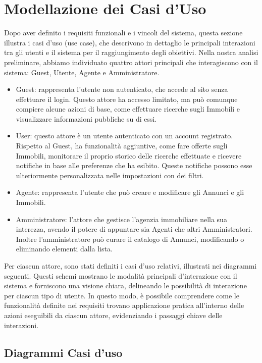 \newpage
\section{Modellazione dei Casi d'Uso}
Dopo aver definito i requisiti funzionali e i vincoli del sistema, questa sezione illustra i casi
d'uso (use case), che descrivono in dettaglio le principali interazioni tra gli utenti e il sistema
per il raggiungimento degli obiettivi. Nella nostra analisi preliminare, abbiamo individuato quattro
attori principali che interagiscono con il sistema: Guest, Utente, Agente e Amministratore.\\
\begin{itemize}
    \item Guest: rappresenta l'utente non autenticato, che accede al sito senza effettuare il login. Questo attore ha accesso limitato, ma può comunque compiere alcune azioni di base, come
effettuare ricerche sugli Immobili e visualizzare informazioni pubbliche su di essi.
\item User: questo attore è un utente autenticato con un account registrato. Rispetto al Guest, ha funzionalità aggiuntive, come fare
offerte sugli Immobili, monitorare il proprio storico delle ricerche effettuate e ricevere notifiche in base alle preferenze che ha esibito. Queste notifiche possono esse ulteriormente personalizzata nelle impostazioni con dei filtri.
\item Agente: rappresenta l'utente che può creare e modificare gli Annunci e gli Immobili.
\item Amministratore: l'attore che gestisce l'agenzia immobiliare nella sua interezza, avendo il potere di appuntare sia Agenti che altri Amministratori. Inoltre l'amministratore può curare il catalogo di Annunci, modificando o eliminando elementi dalla lista.
\end{itemize}
Per ciascun attore, sono stati definiti i casi d'uso relativi, illustrati nei diagrammi seguenti.
Questi schemi mostrano le modalità principali d'interazione con il sistema e forniscono una
visione chiara, delineando le possibilità di interazione per ciascun tipo di utente. In questo
modo, è possibile comprendere come le funzionalità definite nei requisiti trovano applicazione
pratica all'interno delle azioni eseguibili da ciascun attore, evidenziando i passaggi chiave delle interazioni.
\newpage
\subsection*{Diagrammi Casi d'uso}

